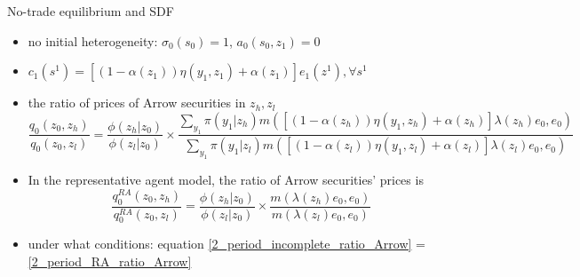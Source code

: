 \documentclass[9pt]{beamer}
\theoremstyle{mystyle}
\begin{document}
\begin{frame}{No-trade equilibrium and SDF}
\begin{itemize}
\item no initial heterogeneity: $\sigma_0(s_0)=1$, $a_0(s_0,z_1)=0$
\vspace{5mm}
\item $c_1(s^1) = [(1-\alpha(z_1))\eta(y_1,z_1)+\alpha(z_1)]e_1(z^1), \forall s^1$
\vspace{5mm}
\item the ratio of prices of Arrow securities in $z_h, z_l$
\begin{equation}\label{2_period_incomplete_ratio_Arrow}
\frac{q_0(z_0,z_h)}{q_0(z_0,z_l)} = \frac{\phi(z_h|z_0)}{\phi(z_l|z_0)}\times\frac{\sum_{y_1}\pi(y_1|z_h)m([(1-\alpha(z_h))\eta(y_1,z_h)+\alpha(z_h)]\lambda(z_h)e_0,e_0)}{\sum_{y_1}\pi(y_1|z_l)m([(1-\alpha(z_l))\eta(y_1,z_l)+\alpha(z_l)]\lambda(z_l)e_0,e_0)}
\end{equation}
\vspace{5mm}
\item In the representative agent model, the ratio of Arrow securities' prices is
\begin{equation}\label{2_period_RA_ratio_Arrow}
\frac{q_0^{RA}(z_0,z_h)}{q^{RA}_0(z_0,z_l)} = \frac{\phi(z_h|z_0)}{\phi(z_l|z_0)}\times\frac{m(\lambda(z_h)e_0,e_0)}{m(\lambda(z_l)e_0,e_0)}
\end{equation}
\vspace{5mm}
\item under what conditions: equation \ref{2_period_incomplete_ratio_Arrow} = \ref{2_period_RA_ratio_Arrow}$\quad$
\end{itemize}
\end{frame}
\end{document}
